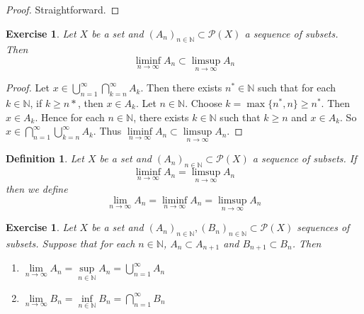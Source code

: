 \documentclass[12pt]{amsart}
\newtheorem{defn}[thm]{Definition}
\newtheorem{ex}[thm]{Exercise}
\newcommand{\N}{\mathbb{N}}
\newcommand{\MP}{\mathcal{P}}
\newcommand{\limn}{\lim \limits_{n \rightarrow \infty}}
\begin{document}
\begin{proof}
Straightforward.
\end{proof}

\begin{ex}
Let $X$ be a set and $(A_n)_{n \in \N} \subset \MP(X)$ a sequence of subsets. Then $$\liminf_{n \rightarrow \infty} A_n \subset \limsup_{n \rightarrow \infty} A_n$$
\end{ex}

\begin{proof}
Let $x \in \bigcup\limits_{n=1}^{\infty} \bigcap\limits_{k =n}^{\infty} A_k$. Then there exists $n^* \in \N$ such that for each $k \in \N$, if $k \geq n*$, then $x \in A_k$. Let $n \in \N$. Choose $k = \max\{n^*,n\} \geq n^*$. Then $x \in A_k$. Hence for each $n \in \N$, there exists $k \in \N$ such that $k \geq n$ and $x \in A_k$. So $x \in \bigcap\limits_{n=1}^{\infty} \bigcup\limits_{k=n}^{\infty} A_k$. Thus $\liminf\limits_{n \rightarrow \infty}A_n \subset \limsup\limits_{n \rightarrow \infty}A_n$.
\end{proof}

\begin{defn}
Let $X$ be a set and $(A_n)_{n \in \N} \subset \MP(X)$ a sequence of subsets. If $$\liminf_{n \rightarrow \infty} A_n = \limsup_{n \rightarrow \infty} A_n$$ then we define $$\lim_{n \rightarrow \infty}A_n = \liminf_{n \rightarrow \infty} A_n = \limsup_{n \rightarrow \infty} A_n$$ 
\end{defn}

\begin{ex}
Let $X$ be a set and $(A_n)_{n \in \N}, (B_n)_{n \in \N} \subset \MP(X)$ sequences of subsets. Suppose that for each $n \in \N$, $A_n \subset A_{n+1}$ and $B_{n+1} \subset B_n$. Then 
\begin{enumerate}
\item $\limn A_n = \sup\limits_{n \in \N}A_n = \bigcup\limits_{n=1}^{\infty}A_n$
\item $\limn B_n = \inf\limits_{n \in \N}B_n = \bigcap\limits_{n=1}^{\infty}B_n$
\end{enumerate}
\end{ex}
\end{document}
